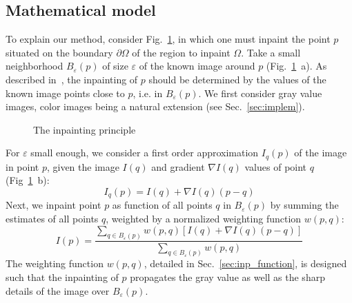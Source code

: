 \documentclass{llncs}
\begin{document}
\subsection{Mathematical model}
\label{sec:model}
%
 To explain our method, consider Fig.~\ref{fig:method}, in which one must
inpaint the point $p$ situated on the boundary $\partial\Omega$ of the
region to inpaint $\Omega$. Take a small neighborhood $B_{\varepsilon}(p)$
of size $\varepsilon$ of the known image around $p$
(Fig.~\ref{fig:method}~a). As described in~\cite{bertalmio1,oliveira,chan},
the inpainting of $p$ should be determined by the values
of the known image points close to $p$, i.e. in $B_{\varepsilon}(p)$. 
We first consider gray value images, color images being a natural extension (see Sec.~\ref{sec:implem}).
%
	\begin{figure}[h] \centering
	\caption{The inpainting principle}
	\label{fig:method} 
        \end{figure} 
%
For $\varepsilon$ small enough, we consider a first order approximation $I_q(p)$
of the image in point $p$, given the image $I(q)$ and gradient $\nabla I(q)$
values of point $q$ (Fig~\ref{fig:method}~b):
%
%
\begin{equation}
   I_q(p) = I(q) + \nabla I(q) (p-q)
\label{eqn:linear}
\end{equation}
%
%
Next, we inpaint point $p$ as function of all points $q$ in
$B_{\varepsilon}(p)$ by summing the estimates of all points $q$, 
weighted by a normalized weighting function $w(p,q)$:
%
%
\begin{equation}
  I(p) = \frac{\sum_{q \in B_{\varepsilon}(p)} w(p,q) [I(q) + \nabla I(q) (p-q)]}
              {\sum_{q \in B_{\varepsilon}(p)} w(p,q)}
\label{eqn:sum}
\end{equation}
%
%
The weighting function $w(p,q)$, detailed in Sec.~\ref{sec:inp_function}, 
is designed such that the inpainting of $p$ propagates the gray value as well 
as the sharp details of the image over $B_{\varepsilon}(p)$. 
%
\end{document}
